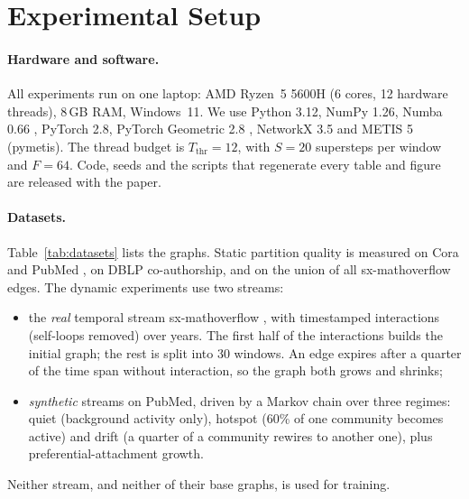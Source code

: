 \section{Experimental Setup}\label{sec:setup}

\paragraph{Hardware and software.}
All experiments run on one laptop: AMD Ryzen~5 5600H (6 cores, 12 hardware threads), 8\,GB RAM,
Windows~11. We use Python 3.12, NumPy 1.26, Numba 0.66 \cite{lam2015numba}, PyTorch 2.8, PyTorch
Geometric 2.8 \cite{fey2019pyg}, NetworkX 3.5 and METIS 5 (pymetis). The thread budget is
$T_{\mathrm{thr}}=12$, with $S=20$ supersteps per window and $F=64$. Code, seeds and the scripts
that regenerate every table and figure are released with the paper.

\paragraph{Datasets.}
Table~\ref{tab:datasets} lists the graphs. Static partition quality is measured on Cora and
PubMed \cite{sen2008collective,yang2016planetoid}, on DBLP co-authorship, and on the union of all
sx-mathoverflow edges. The dynamic experiments use two streams:
\begin{itemize}
  \item the \emph{real} temporal stream sx-mathoverflow \cite{paranjape2017motifs}, with
        \MathInteractions{} timestamped interactions (self-loops removed) over \MathYears{} years.
        The first half of the interactions builds the initial graph; the rest is split into
        30 windows. An edge expires after a quarter of the time span without interaction, so the
        graph both grows and shrinks;
  \item \emph{synthetic} streams on PubMed, driven by a Markov chain over three regimes: quiet
        (background activity only), hotspot (60\% of one community becomes active) and drift (a
        quarter of a community rewires to another one), plus preferential-attachment growth.
\end{itemize}
Neither stream, and neither of their base graphs, is used for training.

\begin{table}[t]
\centering
\caption{Graphs and streams. Dynamic streams have 30 windows; $|A_t|/|V|$ is the mean active fraction.}\label{tab:datasets}
\end{table}

